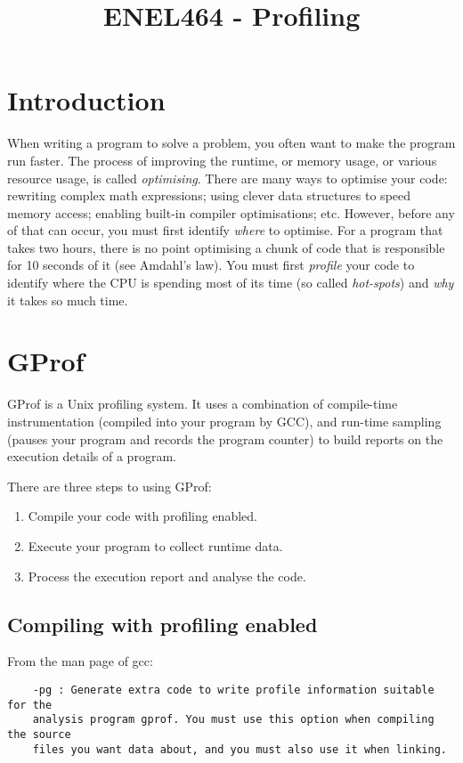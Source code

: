 \documentclass[a4paper,11pt]{article}
\begin{document}
\title{ \bf ENEL464 - Profiling }
\author{}
\date{}
\maketitle


\section{Introduction}

When writing a program to solve a problem, you often want to make the program
run faster. The process of improving the runtime, or memory usage, or various
resource usage, is called \emph{optimising}. There are many ways to optimise
your code: rewriting complex math expressions; using clever data structures to
speed memory access; enabling built-in compiler optimisations; etc. However,
before any of that can occur, you must first identify \emph{where} to optimise.
For a program that takes two hours, there is no point optimising a chunk of code
that is responsible for 10 seconds of it (see Amdahl's law). You must first
\emph{profile} your code to identify where the CPU is spending most of its time
(so called \emph{hot-spots}) and \emph{why} it takes so much time.

\section{GProf}

GProf is a Unix profiling system. It uses a combination of
compile-time instrumentation (compiled into your program by GCC), and
run-time sampling (pauses your program and records the program
counter) to build reports on the execution details of a program.

There are three steps to using GProf:
\begin{enumerate}
    \item Compile your code with profiling enabled.
    \item Execute your program to collect runtime data.
    \item Process the execution report and analyse the code.
\end{enumerate}

\subsection{Compiling with profiling enabled}

From the man page of gcc:
%
\begin{verbatim}
    -pg : Generate extra code to write profile information suitable for the
    analysis program gprof. You must use this option when compiling the source
    files you want data about, and you must also use it when linking.
\end{verbatim}
\end{document}
